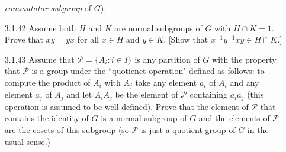 \begin{enumerate}
                  \textit{commutator subgroup} of $G$).
   \item[3.1.42]  Assume both $H$ and $K$ are normal subgroups of $G$ with
                  $H \cap K = 1$. Prove that $xy = yx$ for all $x \in H$ and
                  $y \in K$. [Show that $x^{-1}y^{-1}xy \in H \cap K$.]
   \item[3.1.43]  Assume that $\mathcal{P} = \{A_i : i \in I\}$ is any partition
                  of $G$ with the property that $\mathcal{P}$ is a group under
                  the ``quotienet operation" defined as follows: to compute the
                  product of $A_i$ with $A_j$ take any element $a_i$ of $A_i$
                  and any element $a_j$ of $A_j$ and let $A_iA_j$ be the element
                  of $\mathcal{P}$ containing $a_ia_j$ (this operation is
                  assumed to be well defined). Prove that the element of
                  $\mathcal{P}$ that contains the identity of $G$ is a normal
                  subgroup of $G$ and the elements of $\mathcal{P}$ are the
                  cosets of this subgroup (so $\mathcal{P}$ is just a quotient
                  group of $G$ in the usual sense.)
\end{enumerate}
